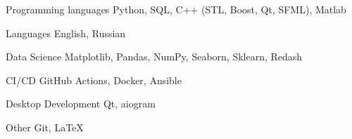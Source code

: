 
\begin{cvskills}

  \cvskill
  {Programming languages}
  {Python, SQL, C++ (STL, Boost, Qt, SFML), Matlab}

  \cvskill
  {Languages}
  {English, Russian}

  \cvskill
  {Data Science}
  {Matplotlib, Pandas, NumPy, Seaborn, Sklearn, Redash}

  \cvskill
  {CI/CD}
  {GitHub Actions, Docker, Ansible}

  \cvskill
  {Desktop Development}
  {Qt, aiogram}

  \cvskill
  {Other}
  {Git, {\selectfont \LaTeX}}

\end{cvskills}
